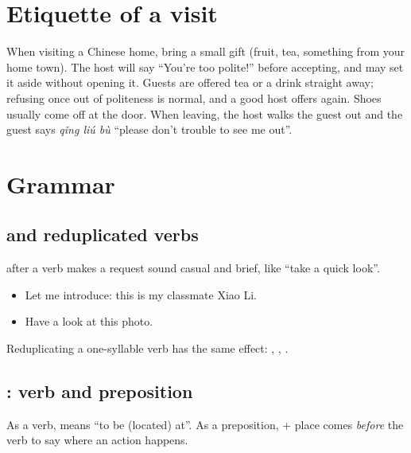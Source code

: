 \section{Etiquette of a visit}

\begin{aside}
When visiting a Chinese home, bring a small gift (fruit, tea, something from your home
town). The host will say  ``You're too polite!'' before accepting, and
may set it aside without opening it. Guests are offered tea or a drink straight away;
refusing once out of politeness is normal, and a good host offers again. Shoes usually
come off at the door. When leaving, the host walks the guest out and the guest says
 \emph{qǐng liú bù} ``please don't trouble to see me out''.
\end{aside}

\section{Grammar}

\subsection{ and reduplicated verbs}

 after a verb makes a request sound casual and brief, like ``take a quick
look''.
\begin{itemize}
  \item {} Let me introduce: this is my classmate Xiao Li.
  \item {} Have a look at this photo.
\end{itemize}
Reduplicating a one-syllable verb has the same effect: , ,
.

\subsection{: verb and preposition}

As a verb,  means ``to be (located) at''. As a preposition,  + place
comes \emph{before} the verb to say where an action happens.

